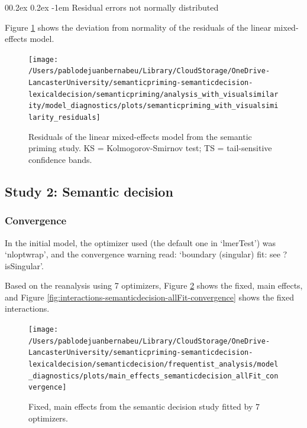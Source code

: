 \documentclass[
  12pt,
  man,floatsintext]{apa7}
\makeatletter
\let\oldparagraph\paragraph
\renewcommand{\paragraph}[1]{\oldparagraph{#1}\mbox{}}
\renewcommand{\paragraph}{\@startsection{paragraph}{4}{\parindent}%
  {0\baselineskip \@plus 0.2ex \@minus 0.2ex}%
  {-1em}%
  {\normalfont\normalsize\bfseries\itshape\typesectitle}}
\makeatother
\begin{document}
\hypertarget{residual-errors-not-normally-distributed-2}{%
\paragraph{Residual errors not normally distributed}\label{residual-errors-not-normally-distributed-2}}

Figure \ref{fig:semanticpriming-with-visualsimilarity-residuals} shows the deviation from normality of the residuals of the linear mixed-effects model.

\begin{figure}

{\centering \texttt{[image: /Users/pablodejuanbernabeu/Library/CloudStorage/OneDrive-LancasterUniversity/semanticpriming-semanticdecision-lexicaldecision/semanticpriming/analysis\_with\_visualsimilarity/model\_diagnostics/plots/semanticpriming\_with\_visualsimilarity\_residuals]} 

}

\caption{Residuals of the linear mixed-effects model from the semantic priming study. \linebreak KS = Kolmogorov-Smirnov test; TS = tail-sensitive confidence bands.}\label{fig:semanticpriming-with-visualsimilarity-residuals}
\end{figure}

\hypertarget{study-2-semantic-decision-2}{%
\subsection{Study 2: Semantic decision}\label{study-2-semantic-decision-2}}

\hypertarget{convergence-1}{%
\subsubsection{Convergence}\label{convergence-1}}

In the initial model, the optimizer used (the default one in `lmerTest') was `nloptwrap', and the convergence warning read: `boundary (singular) fit: see ?isSingular'.

Based on the reanalysis using 7 optimizers, Figure \ref{fig:main-effects-semanticdecision-allFit-convergence} shows the fixed, main effects, and Figure \ref{fig:interactions-semanticdecision-allFit-convergence} shows the fixed interactions.

\begin{figure}

{\centering \texttt{[image: /Users/pablodejuanbernabeu/Library/CloudStorage/OneDrive-LancasterUniversity/semanticpriming-semanticdecision-lexicaldecision/semanticdecision/frequentist\_analysis/model\_diagnostics/plots/main\_effects\_semanticdecision\_allFit\_convergence]} 

}

\caption{Fixed, main effects from the semantic decision study fitted by 7 optimizers.}\label{fig:main-effects-semanticdecision-allFit-convergence}
\end{figure}
\end{document}
